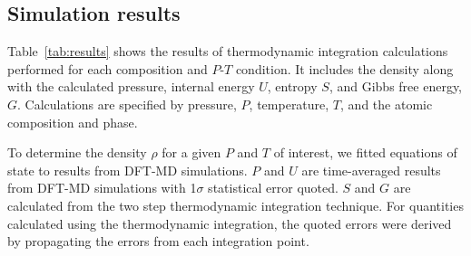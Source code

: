 \subsection{Simulation results} \label{sec:simulation}
Table~\ref{tab:results} shows the results of thermodynamic integration
calculations performed for each composition and $P$-$T$ condition. It
includes the density along with the calculated pressure, internal energy
$U$, entropy $S$, and Gibbs free energy, $G$. Calculations are specified by
pressure, $P$, temperature, $T$, and the atomic composition and phase.

To determine the density $\rho$ for a given $P$ and $T$ of interest, we
fitted equations of state to results from DFT-MD simulations. $P$ and $U$
are time-averaged results from DFT-MD simulations with 1$\sigma$
statistical error quoted. $S$ and $G$ are calculated from the two step
thermodynamic integration technique. For quantities calculated using the
thermodynamic integration, the quoted errors were derived by propagating
the errors from each integration point.



